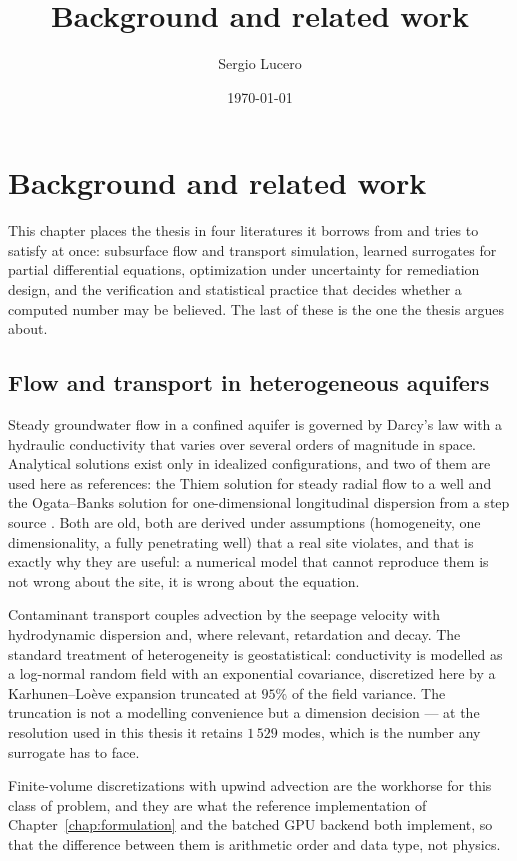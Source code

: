 \documentclass[11pt]{article}
\title{Background and related work}
\author{Sergio Lucero}
\date{\today}
\begin{document}
\maketitle

\section{Background and related work}
This chapter places the thesis in four literatures it borrows from and tries to
satisfy at once: subsurface flow and transport simulation, learned surrogates for
partial differential equations, optimization under uncertainty for remediation
design, and the verification and statistical practice that decides whether a
computed number may be believed. The last of these is the one the thesis argues
about.

\subsection{Flow and transport in heterogeneous aquifers}

Steady groundwater flow in a confined aquifer is governed by Darcy's law with a
hydraulic conductivity that varies over several orders of magnitude in space.
Analytical solutions exist only in idealized configurations, and two of them are
used here as references: the Thiem solution for steady radial flow to a well
\citep{thiem1906,bear1972} and the Ogata--Banks solution for one-dimensional
longitudinal dispersion from a step source \citep{ogata1961solution}. Both are
old, both are derived under assumptions (homogeneity, one dimensionality, a fully
penetrating well) that a real site violates, and that is exactly why they are
useful: a numerical model that cannot reproduce them is not wrong about the site,
it is wrong about the equation.

Contaminant transport couples advection by the seepage velocity with hydrodynamic
dispersion and, where relevant, retardation and decay. The standard treatment of
heterogeneity is geostatistical: conductivity is modelled as a log-normal random
field with an exponential covariance, discretized here by a Karhunen--Lo\`eve
expansion truncated at $95\%$ of the field variance. The truncation is not a
modelling convenience but a dimension decision --- at the resolution used in this
thesis it retains $1\,529$ modes, which is the number any surrogate has to face.

Finite-volume discretizations with upwind advection \citep{leveque2002finite} are
the workhorse for this class of problem, and they are what the reference
implementation of Chapter~\ref{chap:formulation} and the batched GPU backend both
implement, so that the difference between them is arithmetic order and data type,
not physics.
\end{document}
